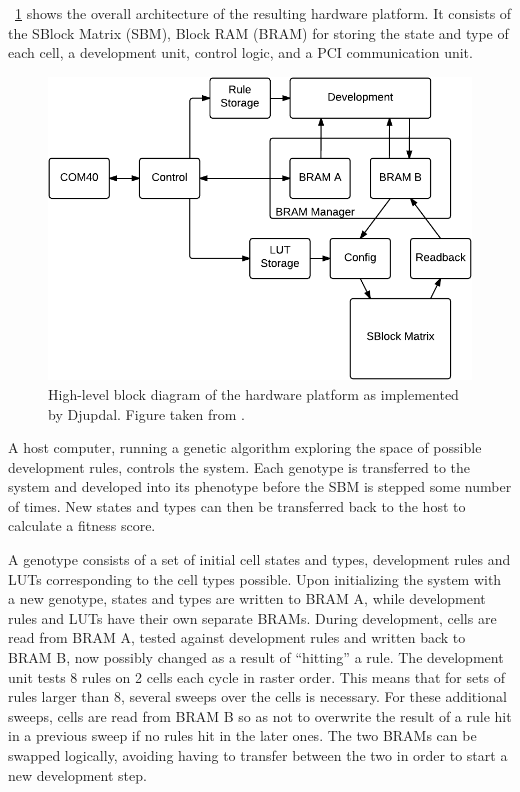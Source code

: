 \figurename~\ref{fig:overview-djupdal} shows the overall architecture of the
resulting hardware platform. It consists of the SBlock Matrix (SBM), Block RAM
(BRAM) for storing the state and type of each cell, a development unit, control
logic, and a PCI communication unit.

\begin{figure}[!ht]
    \centering
    \includegraphics[width=0.8\linewidth]{fig/overview-djupdal}
    \caption[Djupdal's hardware design]{
        High-level block diagram of the hardware platform as implemented by
        Djupdal. Figure taken from \cite{Lundal2015a}.
    }
    \label{fig:overview-djupdal}
\end{figure}

A host computer, running a genetic algorithm exploring the space of possible
development rules, controls the system. Each genotype is transferred to the
system and developed into its phenotype before the SBM is stepped some number of
times. New states and types can then be transferred back to the host to
calculate a fitness score.

A genotype consists of a set of initial cell states and types, development rules
and LUTs corresponding to the cell types possible. Upon initializing the system
with a new genotype, states and types are written to BRAM A, while development
rules and LUTs have their own separate BRAMs. During development, cells are read
from BRAM A, tested against development rules and written back to BRAM B, now possibly
changed as a result of ``hitting'' a rule. The development unit tests 8 rules on
2 cells each cycle in raster order. This means that for sets of rules larger
than 8, several sweeps over the cells is necessary. For these additional sweeps,
cells are read from BRAM B so as not to overwrite the result of a rule hit in a
previous sweep if no rules hit in the later ones. The two BRAMs can be swapped
logically, avoiding having to transfer between the two in order to start a new
development step.

